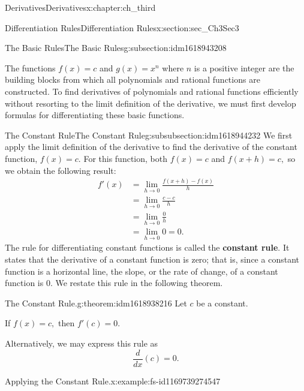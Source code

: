 \documentclass[oneside,10pt,]{book}
\newcommand{\terminology}[1]{\textbf{#1}}
\numberwithin{equation}{section}
\newcommand{\amp}{&}
\begin{document}
\begin{chapterptx}{Derivatives}{}{Derivatives}{}{}{x:chapter:ch_third}
\begin{sectionptx}{Differentiation Rules}{}{Differentiation Rules}{}{}{x:section:sec_Ch3Sec3}
%
%
\typeout{************************************************}
\typeout{************************************************}
%
\begin{subsectionptx}{The Basic Rules}{}{The Basic Rules}{}{}{g:subsection:idm1618943208}
\begin{introduction}{}%
The functions \(f(x)=c\) and \(g(x)=x^n\) where \(n\) is a positive integer are the building blocks from which all polynomials and rational functions are constructed. To find derivatives of polynomials and rational functions efficiently without resorting to the limit definition of the derivative, we must first develop formulas for differentiating these basic functions.%
\end{introduction}%
%
%
\typeout{************************************************}
\typeout{************************************************}
%
\begin{subsubsectionptx}{The Constant Rule}{}{The Constant Rule}{}{}{g:subsubsection:idm1618944232}
We first apply the limit definition of the derivative to find the derivative of the constant function, \(f(x)=c.\) For this function, both \(f(x)=c\) and \(f(x+h)=c,\) so we obtain the following result:%
%
\begin{align*}
f'(x)\amp=\lim_{h\to 0}\frac{f(x+h)-f(x)}{h}\\
\amp=\lim_{h\to 0}\frac{c-c}{h}\\
\amp=\lim_{h\to 0}\frac{0}{h}\\
\amp=\lim_{h\to 0}0=0.
\end{align*}
The rule for differentiating constant functions is called the \terminology{constant rule}. It states that the derivative of a constant function is zero; that is, since a constant function is a horizontal line, the slope, or the rate of change, of a constant function is \(0.\) We restate this rule in the following theorem.%
\begin{theorem}{The Constant Rule.}{}{g:theorem:idm1618938216}%
Let \(c\) be a constant.%
\par
If \(f(x)=c,\) then \(f'(c)=0.\)%
\par
Alternatively, we may express this rule as%
%
\begin{equation*}
\frac{d}{dx}(c)=0.
\end{equation*}
\end{theorem}
\begin{example}{Applying the Constant Rule.}{x:example:fs-id1169739274547}%

\end{example}
\end{subsubsectionptx}
\end{subsectionptx}
\end{sectionptx}
\end{chapterptx}
\end{document}
